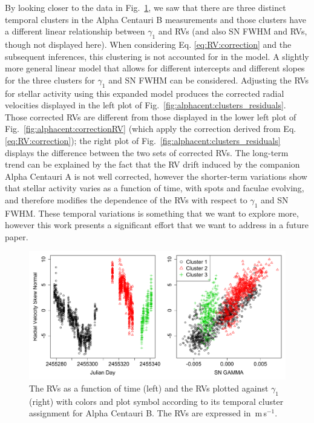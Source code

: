 \documentclass[11pt, oneside]{article}
\def\ms{\hbox{\,m\,s$^{-1}$}}         %
\begin{document}
By looking closer to the data in Fig.~\ref{fig:alphacent:clusters}, we saw that there are three distinct temporal clusters in the Alpha Centauri B measurements and those clusters have a different linear relationship between $\gamma_1$ and RVs (and also SN FWHM and RVs, though not displayed here). When considering Eq. \ref{eq:RV:correction} and the subsequent inferences, this clustering is not accounted for in the model. A slightly more general linear model that allows for different intercepts and different slopes for the three clusters for $\gamma_1$ and SN FWHM can be considered.  Adjusting the RVs for stellar activity using this expanded model produces the corrected radial velocities displayed in the left plot of Fig.~\ref{fig:alphacent:clusters_residuals}.  Those corrected RVs are different from those displayed in the lower left plot of Fig.~\ref{fig:alphacent:correctionRV} (which apply the correction derived from Eq. \ref{eq:RV:correction}); the right plot of Fig.~\ref{fig:alphacent:clusters_residuals} displays the difference between the two sets of corrected RVs. The long-term trend can be explained by the fact that the RV drift induced by the companion Alpha Centauri A is not well corrected, however the shorter-term variations show that stellar activity varies as a function of time, with spots and faculae evolving, and therefore modifies the dependence of the RVs with respect to $\gamma_1$ and SN FWHM. These temporal variations is something that we want to explore more, however this work presents a significant effort that we want to address in a future paper.

\begin{figure}[htbp]
   \centering
\includegraphics[width = 6in]{AlphaCenB_clusters.pdf}  
   \caption{The RVs as a function of time (left) and the RVs plotted against $\gamma_1$ (right) with colors and plot symbol according to its temporal cluster assignment for Alpha Centauri B. The RVs are expressed in \ms.}
   \label{fig:alphacent:clusters}
\end{figure}
\end{document}
